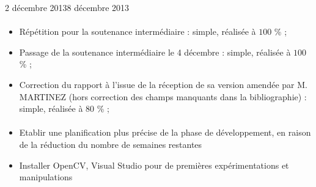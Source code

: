 \documentclass[11pt, french]{report-rd-info}
\begin{document}
\begin{fichesuivi}{2 décembre 2013}{8 décembre 2013}
\paragraph{}
	\begin{travaileffectue}
		\begin{itemize}
			\item Répétition pour la soutenance intermédiaire : simple, réalisée à $100$ \% ;
			\item Passage de la soutenance intermédiaire le 4 décembre : simple, réalisée à $100$ \% ;
			\item Correction du rapport à l'issue de la réception de sa version amendée par M. MARTINEZ (hors correction des champs manquants dans la bibliographie) :  simple, réalisée à $80$ \% ;
		\end{itemize}
	\end{travaileffectue}

\paragraph*{}
	\begin{planification}
		\begin{itemize}
			\item Etablir une planification plus précise de la phase de développement, en raison de la réduction du nombre de semaines restantes
			\item Installer OpenCV, Visual Studio pour de premières expérimentations et manipulations
		\end{itemize}
	\end{planification}
\end{fichesuivi}
\end{document}
